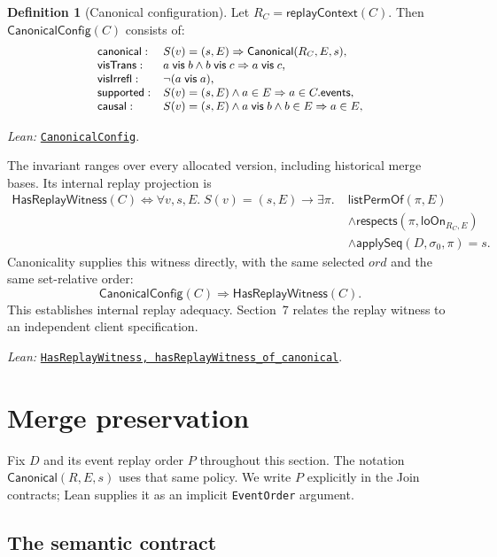 \documentclass[11pt]{article}
\theoremstyle{definition}
\newtheorem{definition}[theorem]{Definition}
\newcommand{\init}{\sigma_0}
\newcommand{\applySeq}{\mathsf{applySeq}}
\newcommand{\vis}{\mathrel{\mathsf{vis}}}
\newcommand{\loOn}{\mathsf{loOn}}
\newcommand{\Can}{\mathsf{Canonical}}
\newcommand{\lean}[1]{\texttt{#1}}
\newcommand{\src}[2]{\href{../../#1}{\texttt{#2}}}
\newcommand{\anchor}[2]{\par\smallskip\noindent\emph{Lean: }\src{#1}{#2}.}
\begin{document}
\begin{definition}[Canonical configuration]
Let $R_C=\mathsf{replayContext}(C)$. Then
$\mathsf{CanonicalConfig}(C)$ consists of:
\[\small
\begin{array}{ll}
\mathsf{canonical}:&S(v)=(s,E)\Rightarrow\Can(R_C,E,s),\\
\mathsf{visTrans}:&a\vis b\land b\vis c\Rightarrow a\vis c,\\
\mathsf{visIrrefl}:&\neg(a\vis a),\\
\mathsf{supported}:&S(v)=(s,E)\land a\in E\Rightarrow a\in C.\mathsf{events},\\
\mathsf{causal}:&S(v)=(s,E)\land a\vis b\land b\in E\Rightarrow a\in E,
\end{array}
\]
\anchor{Sal/MRDTs/Metatheory/Adequacy.lean}{CanonicalConfig}
\end{definition}

The invariant ranges over every allocated version, including historical merge
bases. Its internal replay projection is
\[
\begin{aligned}
 \mathsf{HasReplayWitness}(C)\Longleftrightarrow
 \forall v,s,E.\;S(v)=(s,E)\to\exists\pi.\;&
 \mathsf{listPermOf}(\pi,E)\\
 &\land\mathsf{respects}(\pi,\loOn_{R_C,E})\\
 &\land\applySeq(D,\init,\pi)=s.
\end{aligned}
\]
Canonicality supplies this witness directly, with the same selected $ord$
and the same set-relative order:
\[
 \mathsf{CanonicalConfig}(C)\Longrightarrow\mathsf{HasReplayWitness}(C).
\]
This establishes internal replay adequacy. Section~7 relates the replay
witness to an independent client specification.
\anchor{Sal/MRDTs/Metatheory/Adequacy.lean}
  {HasReplayWitness, hasReplayWitness\_of\_canonical}

\section{Merge preservation}
\label{sec:join}

Fix $D$ and its event replay order $P$ throughout this section. The notation
$\Can(R,E,s)$ uses that same policy. We write $P$ explicitly in the Join
contracts; Lean supplies it as an implicit \lean{EventOrder} argument.

\subsection{The semantic contract}
\end{document}
